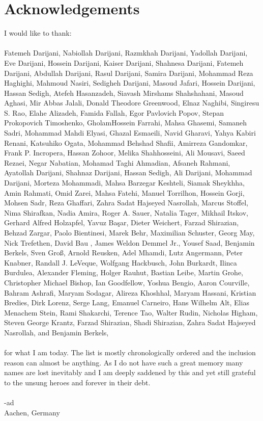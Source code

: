 \chapter*{Acknowledgements}


I would like to thank:\\\\
\noindent Fatemeh Darijani, Nabiollah Darijani, Razmkhah Darijani, Yadollah Darijani, Eve Darijani, Hossein Darijani, 
Kaiser Darijani, Shahnesa Darijani, Fatemeh Darijani, Abdullah Darijani, Rasul Darijani, Samira Darijani, 
Mohammad Reza Haghighi, Mahmoud Nasiri, Sedigheh Darijani, Masoud Jafari, Hossein Darijani, Hassan Sedigh, 
Atefeh Hasanzadeh, Siavash Mirshams Shahshahani, Masoud Aghasi, Mir Abbas Jalali, Donald Theodore Greenwood, Elnaz Naghibi, 
Singiresu S. Rao, Elahe Alizadeh, Famida Fallah, Egor Pavlovich Popov, Stepan Prokopovich Timoshenko, GholamHossein Farrahi, 
Mahsa Ghasemi, Samaneh Sadri, Mohammad Mahdi Elyasi, Ghazal Esmaeili, Navid Gharavi, Yahya Kabiri Renani, Katsuhiko Ogata, 
Mohammad Behshad Shafii, Amirreza Gandomkar, Frank P. Incropera, Hassan Zohoor, Melika Shahhosseini, Ali Mousavi, Saeed Rezaei, Negar Nabatian, 
Mohamad Taghi Ahmadian, Afsaneh Rahmani, Ayatollah Darijani, Shahnaz Darijani, Hassan Sedigh, Ali Darijani, 
Mohammad Darijani, Morteza Mohammadi, Mahsa Barzegar Keshteli, Siamak Sheykhha, Amin Rahmati, Omid Zarei, Mahsa Fatehi, 
Manuel Torrilhon, Hossein Gorji, Mohsen Sadr, Reza Ghaffari, Zahra Sadat Hajseyed Nasrollah, Marcus Stoffel, 
Nima Shirafkan, Nadia Amira, Roger A. Sauer, Natalia Tager, Mikhail Itskov, Gerhard Alfred Holzapfel, Yavuz Başar, 
Dieter Weichert, Farzad Shirazian, Behzad Zargar, Paolo Bientinesi, Marek Behr, Maximilian Schuster, Georg May, 
Nick Trefethen, David Bau {\MakeUppercase{}}, James Weldon Demmel Jr., Yousef Saad, Benjamin Berkels, Sven Groß, 
Arnold Reusken, Adel Mhamdi, Lutz Angermann, Peter Knabner, Randall J. LeVeque, Wolfgang Hackbusch, John Burkardt, 
Ilinca Burdulea, Alexander Fleming, Holger Rauhut, Bastian Leibe, Martin Grohe, Christopher Michael Bishop, Ian Goodfellow, 
Yoshua Bengio, Aaron Courville, Bahram Ashrafi, Maryam Sodagar, Alireza Khoshhal, Maryam Hassani, Kristian Bredies, 
Dirk Lorenz, Serge Lang, Emanuel Carneiro, Hans Wilhelm Alt, Elias Menachem Stein, Rami Shakarchi, Terence Tao, Walter Rudin, Nicholas Higham, 
Steven George Krantz, Farzad Shirazian, Shadi Shirazian, Zahra Sadat Hajseyed Nasrollah, 
and Benjamin Berkels,\\\\
for what I am today. The list is mostly chronologically ordered and the inclusion reason can almost be anything. 
As I do not have such a great memory many names are lost inevitably and I am deeply saddened by this and yet still 
grateful to the unsung heroes  and forever in their debt.
\\\\
-ad\\
Aachen, Germany\\

\endinput